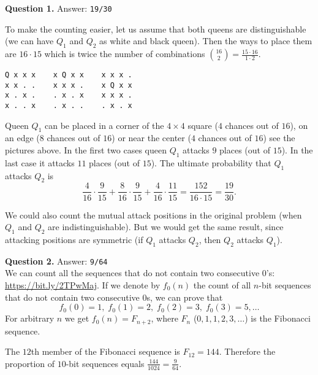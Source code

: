 \documentclass[jou]{apa6}
\begin{document}
\vspace{10pt}
{\bf Question 1.} Answer: {\tt 19/30}

To make the counting easier, let us assume that both queens are distinguishable 
(we can have $Q_1$ and $Q_2$ as white and black queen). 
Then the ways to place them are $16 \cdot 15$ \textendash{} which is twice the number 
of combinations ${16 \choose 2} = \frac{15 \cdot 16}{1 \cdot 2}$. 

\begin{verbatim}
Q x x x    x Q x x    x x x .
x x . .    x x x .    x Q x x
x . x .    . x . x    x x x .
x . . x    . x . .    . x . x
\end{verbatim}

Queen $Q_1$ can be placed in a corner of the $4 \times 4$ square ($4$ chances out of $16$), 
on an edge ($8$ chances out of $16$) or near the center ($4$ chances out of $16$)
\textendash{} see the pictures above.
In the first two cases queen $Q_1$ attacks $9$ places (out of $15$). In the last case
it attacks $11$ places (out of $15$). The ultimate probability that $Q_1$ attacks $Q_2$ 
is
$$\frac{4}{16} \cdot \frac{9}{15} + \frac{8}{16} \cdot \frac{9}{15} + \frac{4}{16} \cdot \frac{11}{15} = \frac{152}{16 \cdot 15} = 
\frac{19}{30}.$$

We could also count the mutual attack positions in the original problem (when $Q_1$ and $Q_2$ 
are indistinguishable). But we would get the same result, since attacking positions
are symmetric (if $Q_1$ attacks $Q_2$, then $Q_2$ attacks $Q_1$).





\vspace{10pt}
{\bf Question 2.} Answer: {\tt 9/64}\\
We can count all the sequences that do not contain two consecutive 0's: \url{https://bit.ly/2TPwMaj}.
If we denote by $f_0(n)$ the count of all $n$-bit sequences that do not contain two consecutive 0s, 
we can prove that 
$$f_0(0)=1,\;f_0(1)=2,\;f_0(2)=3,\;f_0(3)=5,\ldots$$
For arbitrary $n$ we get $f_0(n) = F_{n+2}$, where $F_{n}$ ($0,1,1,2,3,\ldots$) is the 
Fibonacci sequence. 

The $12$th member of the Fibonacci sequence is $F_{12}=144$. 
Therefore the proportion of $10$-bit sequences equals $\frac{144}{1024}=\frac{9}{64}$.
\end{document}
